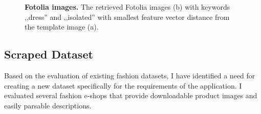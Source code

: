 \documentclass[12pt]{report}
\begin{document}
\begin{figure}[h]
\centering
{}\hspace{1cm}
\caption{\label{fig:fotolia} \textbf{Fotolia images.} The retrieved Fotolia images (b) with keywords ,,dress'' and ,,isolated'' with smallest feature vector distance from the template image (a).}
\end{figure}


\subsection{Scraped Dataset}
Based on the evaluation of existing fashion datasets, I have identified a need for creating a new dataset specifically for the requirements of the application. I evaluated several fashion e-shops that provide downloadable product images and easily parsable descriptions. 
\end{document}
